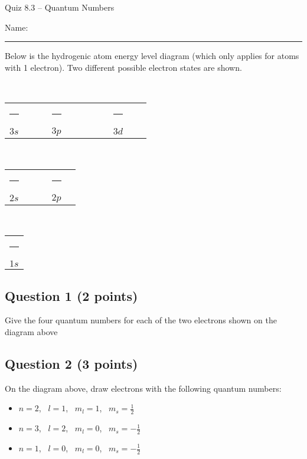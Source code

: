 \documentclass[11pt, letterpaper]{memoir}
\begin{document}
	\begin{center}
		{\large	Quiz 8.3 -- Quantum Numbers}
	\end{center}
{\large Name: \rule[-1mm]{4in}{.1pt}
	
	
	\noindent Below is the hydrogenic atom energy level diagram (which only applies for atoms with 1 electron). Two different possible electron states are shown.
	\begin{center}
		
		~
		
		{\large
		\begin{tabular}{ccccccccccc}
			\rule[-1pt]{1.75em}{0.5pt} &~&\rule[-1pt]{1.75em}{0.5pt}&\rule[-1pt]{1.75em}{0.5pt}&\rule[-1pt]{1.75em}{0.5pt} &~& \rule[-1pt]{1.75em}{0.5pt}&\rule[-1pt]{1.75em}{0.5pt}&\rule[-1pt]{1.75em}{0.5pt}&\rule[-1pt]{1.75em}{0.5pt}&\rule[-1pt]{1.75em}{0.5pt}\\
			{$3s$} &&&{$3p$} &&&&&{$3d$}
		\end{tabular}
		
		~
		
		\begin{tabular}{ccccc}
			\rule[-1pt]{1.75em}{0.5pt} &~&\rule[-1pt]{1.75em}{0.5pt}&\rule[-1pt]{1.75em}{0.5pt}&\rule[-1pt]{1.75em}{0.5pt}\\
			{$2s$} &&&{$2p$}
		\end{tabular}
		
		~
		
		\begin{tabular}{c}
			\rule[-1pt]{1.75em}{0.5pt} \\
			{$1s$}
		\end{tabular}
		}
	\end{center}

	\subsection*{Question 1 (2 points)}
	Give the four quantum numbers for each of the two electrons shown on the diagram above
	
	\vspace{5em}
	\subsection*{Question 2 (3 points)}
	On the diagram above, draw electrons with the following quantum numbers:
	\begin{itemize}
		\item $n=2$, ~$l=1$, ~$m_l=1$, ~$m_s=\frac{1}{2}$
		\item $n=3$, ~$l=2$, ~$m_l=0$, ~$m_s=-\frac{1}{2}$
		\item $n=1$, ~$l=0$, ~$m_l=0$, ~$m_s=-\frac{1}{2}$
	\end{itemize}
	


}
\end{document}

